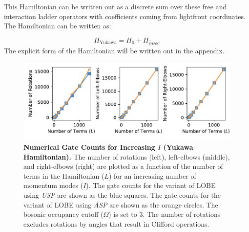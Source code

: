 This Hamiltonian can be written out as a discrete sum over these free and interaction ladder operators with coefficients coming from lightfront coordinates. The Hamiltonian can be written as:

\begin{equation}
    \label{eq:Yukawa-hamiltonian}
    H_{\text{Yukawa}} = H_0 + H_{\bar\psi \psi \phi}.
\end{equation}
The explicit form of the Hamiltonian will be written out in the appendix. 

\begin{figure}
    \centering
    \includegraphics[width=16cm]{figures/Yukawa_hamiltonian_gates_vs_terms.pdf}
    \caption{
        \textbf{Numerical Gate Counts for Increasing $I$ (Yukawa Hamiltonian).}
        The number of rotations (left), left-elbows (middle), and right-elbows (right) are plotted as a function of the number of terms in the Hamiltonian ($L$) for an increasing number of momentum modes ($I$).
        The gate counts for the variant of LOBE using \textit{USP} are shown as the blue squares.
        The gate counts for the variant of LOBE using \textit{ASP} are shown as the orange circles.
        The bosonic occupancy cutoff ($\Omega$) is set to $3$.
        The number of rotations excludes rotations by angles that result in Clifford operations.
    }
    \label{fig:Yukawa_hamiltonian_gates_vs_terms}
\end{figure}
